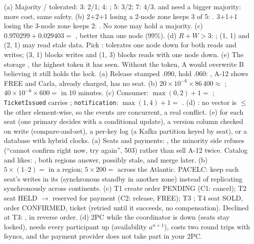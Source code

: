  (a) Majority / tolerated: 3: 2/1; 4: ; 5: 3/2; 7: 4/3.  and need a bigger majority: more cost, same safety. (b) 2$+$2$+$1 losing a 2-node zone keeps 3 of 5: . 3$+$1$+$1 losing the 3-node zone keeps 2: . No zone may hold a majority. (c) $0.970299 + 0.029403 =$ , better than one node (99\%). (d) $R + W > 3$: ; (1, 1) and (2, 1) may read stale data. Pick : tolerates one node down for both reads and writes; (3, 1) blocks writes and (1, 3) blocks reads with one node down. (e) The storage , the highest token it has seen. Without the token, A would overwrite B believing it still holds the lock.
 (a) Release stamped .090, hold .060: , A-12 shows FREE and Carla, already charged, has no seat. (b) $20 \times 10^{-6} \times 86\,400 \approx$ ; $40 \times 10^{-6} \times 600 =$  in 10 minutes. (c) Consumer: $\max(0, 2) + 1 =$ ; \texttt{TicketIssued} carries ; \texttt{notification}: $\max(1, 4) + 1 =$ . (d) : no vector is $\le$ the other element-wise, so the events are concurrent, a real conflict. (e)  for each seat (one primary decides with a conditional update), a version column checked on write (compare-and-set), a per-key log (a Kafka partition keyed by seat), or a database with hybrid clocks.
 (a) Seats and payments: , the minority side refuses (``cannot confirm right now, try again'', 503) rather than sell A-12 twice. Catalog and likes: , both regions answer, possibly stale, and merge later. (b) $5 \times (1\text{--}2) =$  in a region; $5 \times 200 =$  across the Atlantic. PACELC: keep each seat's writes in its  (synchronous standby in another zone) instead of replicating synchronously across continents. (c) T1 create order PENDING (C1: cancel); T2 seat HELD $\to$ reserved for payment (C2: release, FREE); T3 ; T4 seat SOLD, order CONFIRMED, ticket (retried until it succeeds, no compensation). Declined at T3: , in reverse order. (d) 2PC  while the coordinator is down (seats stay locked), needs every participant up (availability $a^{n+1}$), costs two round trips with fsyncs, and the payment provider does not take part in your 2PC.
